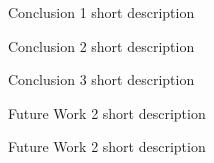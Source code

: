 
\begin{frame}
\begin{block}{Conclusion 1}
short description
\end{block}

\begin{block}{Conclusion 2}
short description
\end{block}

\begin{block}{Conclusion 3}
short description
\end{block}

\end{frame}




%
%
%
%

\begin{frame}

\begin{exampleblock}{Future Work 2}
short description
\end{exampleblock}

\begin{exampleblock}{Future Work 2}
short description
\end{exampleblock}



\end{frame}



